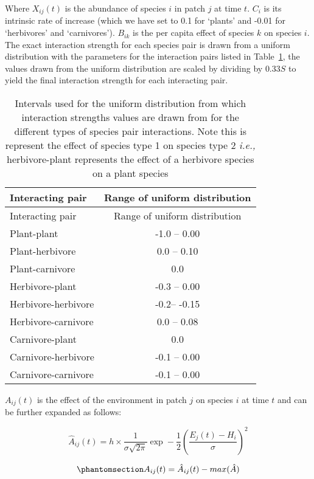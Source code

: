\documentclass[
]{agujournal2019}
\begin{document}
Where \(X_{ij}(t)\) is the abundance of species \(i\) in patch \(j\) at
time \(t\). \(C_i\) is its intrinsic rate of increase (which we have set
to 0.1 for `plants' and -0.01 for `herbivores' and `carnivores').
\(B_{ik}\) is the per capita effect of species \(k\) on species \(i\).
The exact interaction strength for each species pair is drawn from a
uniform distribution with the parameters for the interaction pairs
listed in Table~\ref{tbl-interaction_strength}, the values drawn from
the uniform distribution are scaled by dividing by \(0.33S\) to yield
the final interaction strength for each interacting pair.

\begin{longtable}[]{@{}lc@{}}
\caption{Intervals used for the uniform distribution from which
interaction strengths values are drawn from for the different types of
species pair interactions. Note this is represent the effect of species
type 1 on species type 2 \emph{i.e.,} herbivore-plant represents the
effect of a herbivore species on a plant
species}\label{tbl-interaction_strength}\tabularnewline
\toprule\noalign{}
Interacting pair & Range of uniform distribution \\
\midrule\noalign{}
\endfirsthead
\toprule\noalign{}
Interacting pair & Range of uniform distribution \\
\midrule\noalign{}
\endhead
\bottomrule\noalign{}
\endlastfoot
Plant-plant & -1.0 -- 0.00 \\
Plant-herbivore & 0.0 -- 0.10 \\
Plant-carnivore & 0.0 \\
Herbivore-plant & -0.3 -- 0.00 \\
Herbivore-herbivore & -0.2-- -0.15 \\
Herbivore-carnivore & 0.0 -- 0.08 \\
Carnivore-plant & 0.0 \\
Carnivore-herbivore & -0.1 -- 0.00 \\
Carnivore-carnivore & -0.1 -- 0.00 \\
\end{longtable}

\(A_{ij}(t)\) is the effect of the environment in patch \(j\) on species
\(i\) at time \(t\) and can be further expanded as follows:

\[
\hat{A}_{ij}(t)=h\times\frac{1}{\sigma\sqrt{2\pi}}\exp-\frac{1}{2}\left(\frac{E_{j}(t)-H_{i}}{\sigma}\right)^2
\]

\begin{equation}\phantomsection\label{eq-metacomm_env}{
A_{ij}(t)= \hat{A}_{ij}(t) - max(\hat{A})
}\end{equation}
\end{document}
